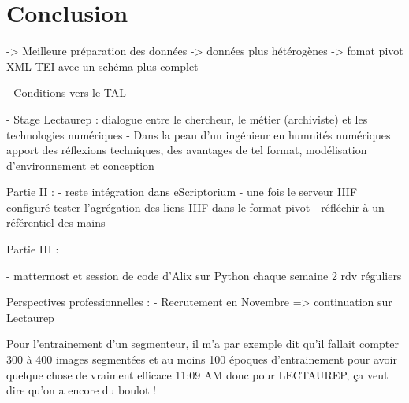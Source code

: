\part*{Conclusion}

-> Meilleure préparation des données 
-> données plus hétérogènes
-> fomat pivot XML TEI avec un schéma plus complet

- Conditions vers le TAL


- Stage Lectaurep : dialogue entre le chercheur, le métier (archiviste) et les technologies numériques 
- Dans la peau d'un ingénieur en humnités numériques apport des réflexions techniques, des avantages de tel format, modélisation d'environnement et conception 

Partie II : 
- reste intégration dans eScriptorium 
- une fois le serveur IIIF configuré tester l'agrégation des liens IIIF dans le format pivot
- réfléchir à un référentiel des mains

Partie III : 

- mattermost et session de code d'Alix sur Python chaque semaine 2 rdv réguliers

Perspectives professionnelles : 
- Recrutement en Novembre => continuation sur Lectaurep 


Pour l'entrainement d'un segmenteur, il m'a par exemple dit qu'il fallait compter 300 à 400 images segmentées et au moins 100 époques d'entrainement pour avoir quelque chose de vraiment efficace
11:09 AM
donc pour LECTAUREP, ça veut dire qu'on a encore du boulot !